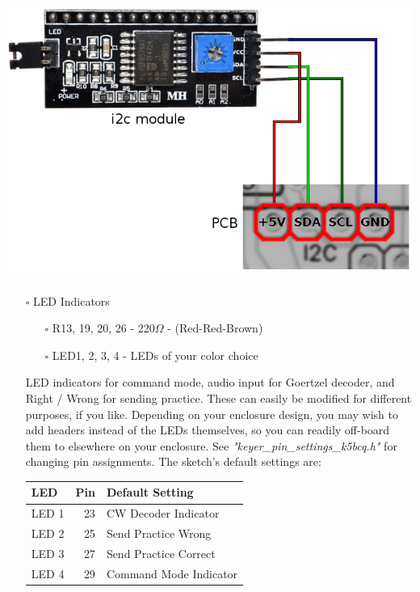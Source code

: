\documentclass[11pt]{article}
\begin{document}
\begin{center}
\includegraphics[width=.9\linewidth]{../png/3.4/i2c_1602LCD.png}
\end{center}
\newpage
\begin{itemize}
\item[{$\square$}] LED Indicators
\begin{itemize}
\item[{$\square$}] R13, 19, 20, 26 - 220\(\Omega\) - (Red-Red-Brown)
\item[{$\square$}] LED1, 2, 3, 4 - LEDs of your color choice
\end{itemize}

LED indicators for command mode, audio input for Goertzel decoder, and Right / Wrong for sending practice.  These can easily be modified for different purposes, if you like.  Depending on your enclosure design, you may wish to add headers instead of the LEDs themselves, so you can readily off-board them to elsewhere on your enclosure.  See \emph{"keyer\_pin\_settings\_k5bcq.h"} for changing pin assignments.  The sketch's default settings are:

\begin{center}
\begin{tabular}{lrl}
LED & Pin & Default Setting\\
\hline
LED 1 & 23 & CW Decoder Indicator\\
LED 2 & 25 & Send Practice Wrong\\
LED 3 & 27 & Send Practice Correct\\
LED 4 & 29 & Command Mode Indicator\\
\end{tabular}
\end{center}
\end{itemize}
\end{document}
